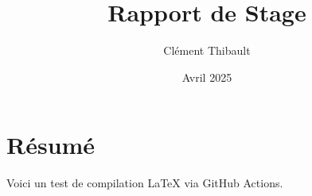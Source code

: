 \documentclass{article}
\title{Rapport de Stage}
\author{Clément Thibault}
\date{Avril 2025}
\begin{document}
\maketitle

\section*{Résumé}
Voici un test de compilation LaTeX via GitHub Actions.
\end{document}
